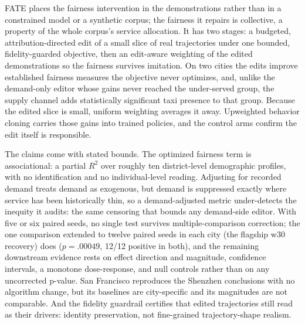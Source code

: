 FATE places the fairness intervention in the demonstrations rather than in a
constrained model or a synthetic corpus; the fairness it repairs is
collective, a property of the whole corpus's service allocation.
It has two
stages: a budgeted, attribution-directed edit of a small slice of real
trajectories under one bounded, fidelity-guarded objective, then an
edit-aware weighting of the edited demonstrations so the fairness survives
imitation. On two cities
the edits improve established fairness measures the objective never
optimizes, and, unlike the demand-only editor whose gains never reached the
under-served group, the supply channel adds statistically significant taxi
presence to that group. Because the edited slice is small, uniform weighting
averages it away. Upweighted behavior cloning carries those gains into
trained policies, and the control arms confirm the edit itself is responsible.

The claims come with stated bounds. The optimized fairness term is
associational: a partial $R^2$ over roughly ten district-level demographic
profiles, with no identification and no individual-level reading.
Adjusting for recorded demand treats demand as exogenous, but demand is
suppressed exactly where service has been historically thin, so a
demand-adjusted metric under-detects the inequity it audits: the same
censoring that bounds any demand-side editor. With five or six paired
seeds, no single test survives multiple-comparison correction; the one
comparison extended to twelve paired seeds in each city (the flagship
w30 recovery) does ($p = .00049$, 12/12 positive in both), and the
remaining downstream evidence rests on effect direction and magnitude,
confidence intervals, a monotone dose-response, and null controls rather
than on any uncorrected p-value. San Francisco reproduces the Shenzhen
conclusions with no algorithm change, but its baselines are city-specific and
its magnitudes are not comparable. And the fidelity guardrail certifies that
edited trajectories still read as their drivers: identity preservation,
not fine-grained trajectory-shape realism.

